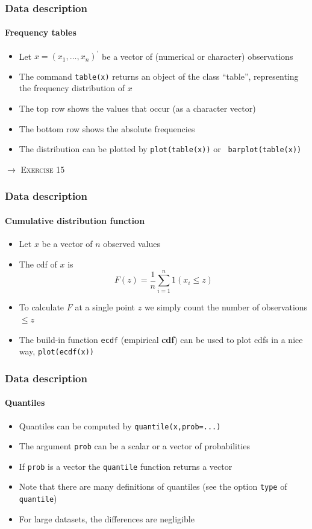 \documentclass[title={Introduction to R}, author={Mutschler and Zaharieva}, inst={Institute for Econometrics and Empirical Economics}]{beamer}
\begin{document}
\begin{frame}
\frametitle{Data description}
\framesubtitle{Frequency tables}
\begin{itemize}
\item Let $x=\left( x_{1},\ldots ,x_{n}\right) ^{\prime }$ be a vector of
(numerical or character) observations
\item The command \texttt{table(x)} returns an object of the class
\textquotedblleft table\textquotedblright , representing the frequency
distribution of $x$
\item The top row shows the values that occur (as a character vector)
\item The bottom row shows the absolute frequencies
\item The distribution can be plotted by \texttt{plot(table(x))} or \texttt{%
barplot(table(x))}
\end{itemize}\pause
$\longrightarrow $ \textsc{Exercise 15}
\end{frame}


\begin{frame}
\frametitle{Data description}
\framesubtitle{Cumulative distribution function}
\begin{itemize}
\item Let $x$ be a vector of $n$ observed values
\item The cdf of $x$ is 
\begin{equation*}
F(z)=\frac{1}{n}\sum_{i=1}^{n}1\left( x_{i}\leq z\right)
\end{equation*}
\item To calculate $F$ at a single point $z$ we simply count the number of
observations $\leq z$
\item The build-in function \texttt{ecdf} (\textbf{e}mpirical \textbf{cdf})
can be used to plot cdfs in a nice way, \texttt{plot(ecdf(x))}
\end{itemize}
\end{frame}


\begin{frame}
\frametitle{Data description}
\framesubtitle{Quantiles}
\begin{itemize}
\item Quantiles can be computed by \texttt{quantile(x,prob=...)}
\item The argument \texttt{prob} can be a scalar or a vector of probabilities
\item If \texttt{prob} is a vector the \texttt{quantile} function returns a
vector
\item Note that there are many definitions of quantiles \newline
(see the option \texttt{type} of \texttt{quantile})
\item For large datasets, the differences are negligible
\end{itemize}
\end{frame}
\end{document}
